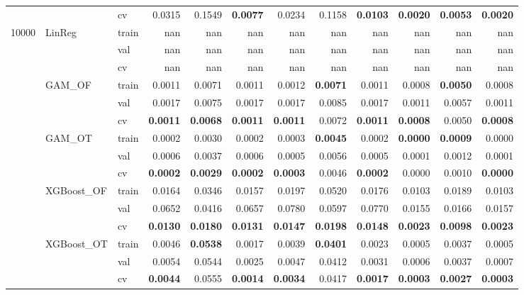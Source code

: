 \begin{tabular}{lllrrrrrrrrr}
 &  & cv & 0.0315 & 0.1549 & \bfseries 0.0077 & 0.0234 & 0.1158 & \bfseries 0.0103 & \bfseries 0.0020 & \bfseries 0.0053 & \bfseries 0.0020 \\
\multirow[c]{15}{*}{10000} & \multirow[c]{3}{*}{LinReg} & train & nan & nan & nan & nan & nan & nan & nan & nan & nan \\
 &  & val & nan & nan & nan & nan & nan & nan & nan & nan & nan \\
 &  & cv & nan & nan & nan & nan & nan & nan & nan & nan & nan \\
 & \multirow[c]{3}{*}{GAM_OF} & train & 0.0011 & 0.0071 & 0.0011 & 0.0012 & \bfseries 0.0071 & 0.0011 & 0.0008 & \bfseries 0.0050 & 0.0008 \\
 &  & val & 0.0017 & 0.0075 & 0.0017 & 0.0017 & 0.0085 & 0.0017 & 0.0011 & 0.0057 & 0.0011 \\
 &  & cv & \bfseries 0.0011 & \bfseries 0.0068 & \bfseries 0.0011 & \bfseries 0.0011 & 0.0072 & \bfseries 0.0011 & \bfseries 0.0008 & 0.0050 & \bfseries 0.0008 \\
 & \multirow[c]{3}{*}{GAM_OT} & train & 0.0002 & 0.0030 & 0.0002 & 0.0003 & \bfseries 0.0045 & 0.0002 & \bfseries 0.0000 & \bfseries 0.0009 & 0.0000 \\
 &  & val & 0.0006 & 0.0037 & 0.0006 & 0.0005 & 0.0056 & 0.0005 & 0.0001 & 0.0012 & 0.0001 \\
 &  & cv & \bfseries 0.0002 & \bfseries 0.0029 & \bfseries 0.0002 & \bfseries 0.0003 & 0.0046 & \bfseries 0.0002 & 0.0000 & 0.0010 & \bfseries 0.0000 \\
 & \multirow[c]{3}{*}{XGBoost_OF} & train & 0.0164 & 0.0346 & 0.0157 & 0.0197 & 0.0520 & 0.0176 & 0.0103 & 0.0189 & 0.0103 \\
 &  & val & 0.0652 & 0.0416 & 0.0657 & 0.0780 & 0.0597 & 0.0770 & 0.0155 & 0.0166 & 0.0157 \\
 &  & cv & \bfseries 0.0130 & \bfseries 0.0180 & \bfseries 0.0131 & \bfseries 0.0147 & \bfseries 0.0198 & \bfseries 0.0148 & \bfseries 0.0023 & \bfseries 0.0098 & \bfseries 0.0023 \\
 & \multirow[c]{3}{*}{XGBoost_OT} & train & 0.0046 & \bfseries 0.0538 & 0.0017 & 0.0039 & \bfseries 0.0401 & 0.0023 & 0.0005 & 0.0037 & 0.0005 \\
 &  & val & 0.0054 & 0.0544 & 0.0025 & 0.0047 & 0.0412 & 0.0031 & 0.0006 & 0.0037 & 0.0007 \\
 &  & cv & \bfseries 0.0044 & 0.0555 & \bfseries 0.0014 & \bfseries 0.0034 & 0.0417 & \bfseries 0.0017 & \bfseries 0.0003 & \bfseries 0.0027 & \bfseries 0.0003 \\
\end{tabular}
